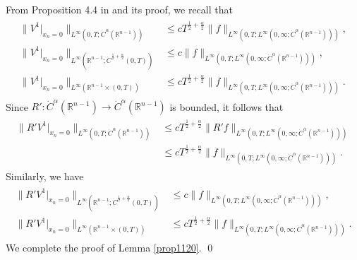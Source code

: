 \documentclass{amsart}
\numberwithin{equation}{section}
\newcommand {\al}{\alpha}
\newcommand{\Rn}{{\mathbb R}^{n-1}}
\begin{document}
From Proposition 4.4 in  \cite{CJ2} and its proof, we recall that
\begin{align*}%
\begin{split}
\|   V^1|_{x_n =0}\|_{L^\infty(0, T; \dot C^\al(\Rn))} &  \leq cT^{\frac12 +\frac{\al}2} \|   f \|_{L^\infty(0, T; L^\infty(0, \infty; \dot C^\al(\Rn)))},\\
\| V^1|_{x_n =0}  \|_{L^\infty( \Rn; \dot C^{\frac12 +\frac{\al}2}(0, T))} &  \leq c   \| f \|_{L^\infty(0, T; L^\infty(0, \infty; \dot C^\al(\Rn)))},\\
\| V^1|_{x_n =0} \|_{L^\infty (\Rn \times (0, T))} &  \leq cT^{\frac12 +\frac{\al}2} \| f \|_{L^\infty(0, T; L^\infty(0, \infty; \dot C^\al(\Rn)))}.
\end{split}
\end{align*}
Since $ R': \dot C^\al(\Rn) \rightarrow \dot C^\al(\Rn)$ is bounded,   it follows that
\begin{align*}%
\begin{split}
\|  R' V^1|_{x_n =0}\|_{L^\infty(0, T; \dot C^\al(\Rn))} &  \leq cT^{\frac12 +\frac{\al}2} \| R'  f \|_{L^\infty(0, T; L^\infty(0, \infty; \dot C^\al(\Rn)))} \\
&  \leq cT^{\frac12 +\frac{\al}2}  \| f \|_{L^\infty(0, T; L^\infty(0, \infty; \dot C^\al(\Rn)))}.
\end{split}
\end{align*}
Similarly, we have 
\begin{align*}
\begin{split}
\| R'  V^1|_{x_n =0}  \|_{L^\infty( \Rn; \dot C^{\frac12 +\frac{\al}2}(0, T))} &  \leq c  \|  f \|_{L^\infty(0, T; L^\infty(0, \infty; \dot C^\al(\Rn)))},\\
\| R' V^1|_{x_n =0} \|_{L^\infty (\Rn \times (0, T))} &  \leq cT^{\frac12 +\frac{\al}2} \|  f \|_{L^\infty(0, T; L^\infty(0, \infty; \dot C^\al(\Rn)))}.
\end{split}
\end{align*}
We complete the proof of Lemma \ref{prop1120}.
\qed
 
 

 
 

 




 
 
\end{document}
